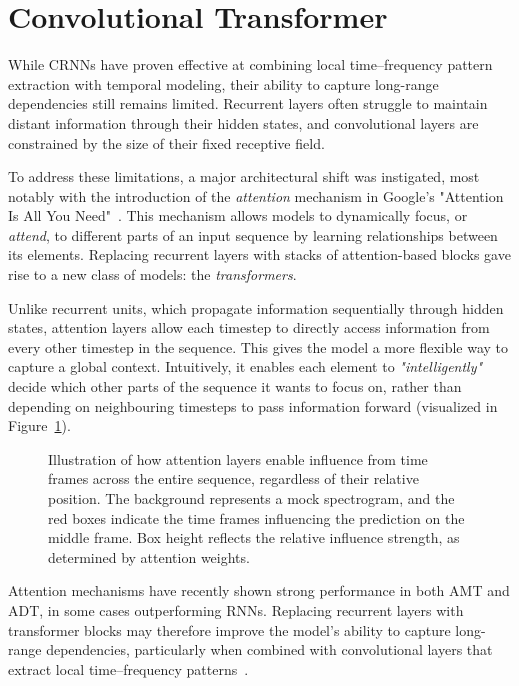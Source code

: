 \section{Convolutional Transformer}

While \glspl{CRNN} have proven effective at combining local time–frequency pattern extraction with temporal modeling, their ability to capture long-range dependencies still remains limited. Recurrent layers often struggle to maintain distant information through their hidden states, and convolutional layers are constrained by the size of their fixed receptive field.

To address these limitations, a major architectural shift was instigated, most notably with the introduction of the \textit{attention} mechanism in Google's "Attention Is All You Need"~\cite{NIPS2017_3f5ee243}. This mechanism allows models to dynamically focus, or \textit{attend}, to different parts of an input sequence by learning relationships between its elements. Replacing recurrent layers with stacks of attention-based blocks gave rise to a new class of models: the \textit{transformers}.

Unlike recurrent units, which propagate information sequentially through hidden states, attention layers allow each timestep to directly access information from every other timestep in the sequence. This gives the model a more flexible way to capture a global context. Intuitively, it enables each element to \textit{"intelligently"} decide which other parts of the sequence it wants to focus on, rather than depending on neighbouring timesteps to pass information forward (visualized in Figure~\ref{CTInfluenceFigure}).

\begin{figure}[H]
    \centering
    
    \caption{Illustration of how attention layers enable influence from time frames across the entire sequence, regardless of their relative position. The background represents a mock spectrogram, and the red boxes indicate the time frames influencing the prediction on the middle frame. Box height reflects the relative influence strength, as determined by attention weights.}
    \label{CTInfluenceFigure}
\end{figure}

Attention mechanisms have recently shown strong performance in both \gls{AMT} and \gls{ADT}, in some cases outperforming \glspl{RNN}. Replacing recurrent layers with transformer blocks may therefore improve the model's ability to capture long-range dependencies, particularly when combined with convolutional layers that extract local time–frequency patterns~\cite{9747048, gardner2022mt3multitaskmultitrackmusic, signals4040042, chang2024yourmt3+, zehren2024analyzingreducingsynthetictorealtransfer}.

